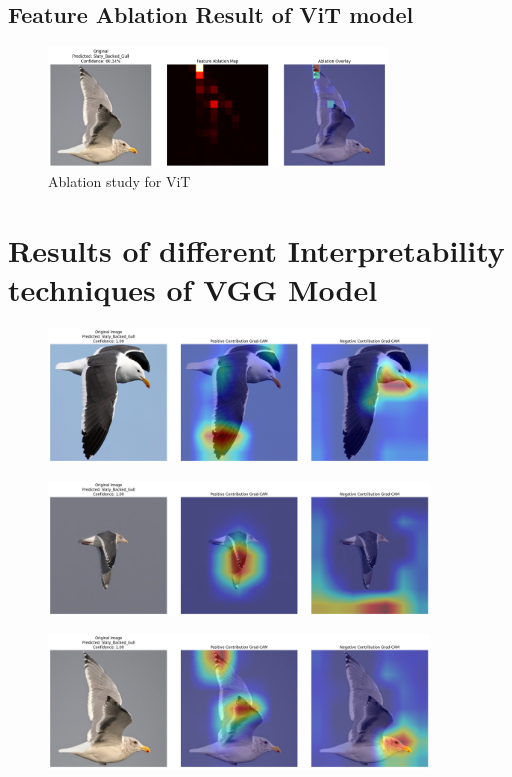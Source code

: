 \documentclass[a4paper,12pt]{report}
\begin{document}
\subsection{Feature Ablation Result of ViT model}
\begin{figure}[H]
    \centering
    \includegraphics[width=0.8\textwidth]{images/appendix/ablationvit.png}
    \caption{Ablation study for ViT}
    \label{fig:ablationvit}
\end{figure}

\section{Results of different Interpretability techniques of VGG Model}

\begin{figure}[H]
    \centering
    \includegraphics[width=0.9\textwidth]{images/appendix/vggcombined/download.png}
\end{figure}

\begin{figure}[H]
    \centering
    \includegraphics[width=0.9\textwidth]{images/appendix/vggcombined/download (1).png}
\end{figure}

\begin{figure}[H]
    \centering
    \includegraphics[width=0.9\textwidth]{images/appendix/vggcombined/download (2).png}
\end{figure}
\end{document}
